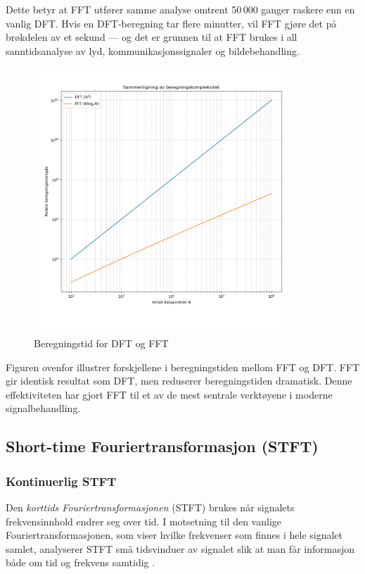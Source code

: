 Dette betyr at FFT utfører samme analyse omtrent 50\,000 ganger raskere enn en vanlig DFT.  
Hvis en DFT-beregning tar flere minutter, vil FFT gjøre det på brøkdelen av et sekund — og det er grunnen til at 
FFT brukes i all sanntidsanalyse av lyd, kommunikasjonssignaler og bildebehandling.

\begin{figure}[H]
    \centering
    \includegraphics[width=0.85\textwidth]{figurer/fft.png}
    \caption{Beregningstid for DFT og FFT}
    \label{fig:fft_vs_dft_tidsbruk}
\end{figure}

Figuren ovenfor illustrer forskjellene i beregningstiden mellom FFT og DFT. FFT gir identisk resultat som 
DFT, men reduserer beregningstiden dramatisk. Denne effektiviteten har gjort FFT til et av de mest sentrale 
verktøyene i moderne signalbehandling.


\subsection{Short-time Fouriertransformasjon (STFT)}
\subsubsection{Kontinuerlig STFT}
Den \emph{korttids Fouriertransformasjonen} (STFT) brukes når signalets frekvensinnhold endrer seg over tid. 
I motsetning til den vanlige Fouriertransformasjonen, som viser hvilke frekvenser som finnes i hele signalet samlet, 
analyserer STFT små tidsvinduer av signalet slik at man får informasjon både om tid og frekvens samtidig \parencite{geeksforgeeks_fourier}. 

